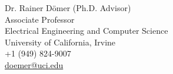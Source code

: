 \begin{comment}
{\begin{tabular*}{6.5in}{l@{\extracolsep{\fill}}l}
Dr. Rainer D\"{o}mer (Ph.D. Advisor) 					&	Dr. Christopher M. O'Neal \\
Associate Professor									&	Associate Director \\
Electrical Engineering and Computer Science				&	Teaching, Learning and Technology Center\\
University of California, Irvine							&	University of California, Irvine\\
+1 (949) 824-9007									&	+1 (949) 824-6307\\
\href{mailto:doemer@uci.edu}{doemer@uci.edu}			& 	\href{mailto:coneal@uci.edu}{coneal@uci.edu}\\
&\\

Dr. Daniel D. Gajski 									&	Dr. Guoyong Shi (Master's Thesis Advisor)\\
Professor, Director									&	Professor \\
Center for Embedded Computer Systems					&	School of Microelectronics \\
University of California, Irvine							&	Shanghai Jiao Tong University\\
+1 (949) 824-4155									&	+86 (21) 34204546 x 1064\\
\href{mailto:gajski@uci.edu}{gajski@uci.edu}				&	\href{mailto:shiguoyong@ic.sjtu.edu.cn}{shiguoyong@ic.sjtu.edu.cn}\\

& \\

Dr. Pai H. Chou									&	\\
Professor											&	\\
Electrical Engineering and Computer Science				&	\\
University of California, Irvine							&	\\
+1 (949) 824-3229									&	\\
\href{mailto:phchou@uci.edu}{phchou@uci.edu}			&	\\

\end{tabular*}}
\\
\end{comment}


Dr. Rainer D\"{o}mer (Ph.D. Advisor) \\
Associate Professor\\
Electrical Engineering and Computer Science\\
University of California, Irvine\\
+1 (949) 824-9007\\
\href{mailto:doemer@uci.edu}{doemer@uci.edu}\\

